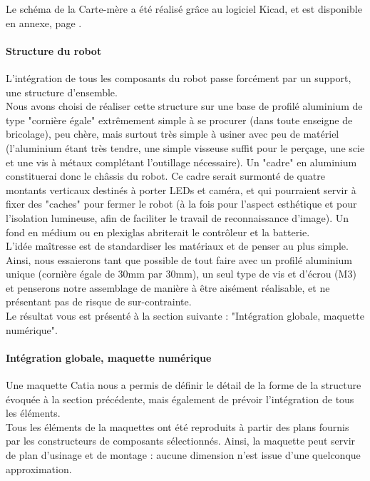 			Le schéma de la Carte-mère a été réalisé grâce au logiciel Kicad, et est disponible en annexe, page \pageref{schemasCarteMere}.

		\paragraph{Structure du robot}

			L'intégration de tous les composants du robot passe forcément par un support, une structure d'ensemble.\\
			Nous avons choisi de réaliser cette structure sur une base de profilé aluminium de type "cornière égale" extrêmement simple à se procurer (dans toute enseigne de bricolage), peu chère, mais surtout très simple à usiner avec peu de matériel (l'aluminium étant très tendre, une simple visseuse suffit pour le perçage, une scie et une vis à métaux complétant l'outillage nécessaire).
			Un "cadre" en aluminium constituerai donc le châssis du robot. Ce cadre serait surmonté de quatre montants verticaux destinés à porter LEDs et caméra, et qui pourraient servir à fixer des "caches" pour fermer le robot (à la fois pour l'aspect esthétique et pour l'isolation lumineuse, afin de faciliter le travail de reconnaissance d'image). Un fond en médium ou en plexiglas abriterait le contrôleur et la batterie.\\

			L'idée maîtresse est de standardiser les matériaux et de penser au plus simple. Ainsi, nous essaierons tant que possible de tout faire avec un profilé aluminium unique (cornière égale de 30mm par 30mm), un seul type de vis et d'écrou (M3) et penserons notre assemblage de manière à être aisément réalisable, et ne présentant pas de risque de sur-contrainte.\\

			Le résultat vous est présenté à la section suivante : "Intégration globale, maquette numérique".

		\paragraph{Intégration globale, maquette numérique}

			Une maquette Catia nous a permis de définir le détail de la forme de la structure évoquée à la section précédente, mais également de prévoir l'intégration de tous les éléments.\\

			Tous les éléments de la maquettes ont été reproduits à partir des plans fournis par les constructeurs de composants sélectionnés. Ainsi, la maquette peut servir de plan d'usinage et de montage : aucune dimension n'est issue d'une quelconque approximation.


